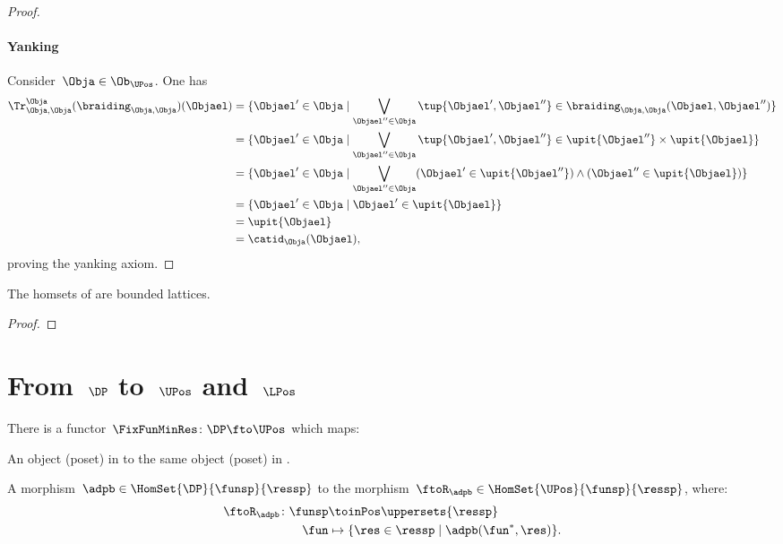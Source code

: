 \begin{proof}
    \paragraph*{Yanking}
    Consider~$\Obja\in \Ob_{\UPos}$. One has
    \begin{equation*}
    \begin{aligned}
        \Tr_{\Obja,\Obja}^{\Obja}(\braiding_{\Obja,\Obja})(\Objael)&=\{ \Objael'\in \Obja \mid \bigvee_{\Objael''\in \Obja}\tup{\Objael',\Objael''}\in \braiding_{\Obja,\Obja}(\Objael,\Objael'')\}\\
        &=\{ \Objael'\in \Obja \mid \bigvee_{\Objael''\in \Obja}\tup{\Objael',\Objael''}\in \upit\{\Objael''\}\times \upit\{ \Objael\}\}\\
        &=\{ \Objael'\in \Obja \mid \bigvee_{\Objael''\in \Obja} (\Objael'\in \upit\{\Objael''\}) \wedge(\Objael'' \in \upit\{ \Objael\})\}\\
        &=\{ \Objael'\in \Obja \mid \Objael'\in \upit\{\Objael\}\}\\
        &=\upit \{\Objael\}\\
        &=\catid_\Obja(\Objael),
    \end{aligned}
    \end{equation*}
    proving the yanking axiom.
\end{proof}

\begin{lemma}\label{lem:UPos-is-traced}
    The homsets of \UPos are bounded lattices.
  \end{lemma}
  \begin{proof}
  \end{proof}
  
  

\section{From~$\DP$ to~$\UPos$ and~$\LPos$}
\begin{lemma}
\label{lem:covfunctor}
There is a functor~$\FixFunMinRes\colon \DP \fto \UPos$ which maps:
\begin{compactenum}
\item An object (poset) in \DP to the same object (poset) in \UPos.
\item A morphism~$\adpb\in \HomSet{\DP}{\funsp}{\ressp}$ to the morphism~$\ftoR_{\adpb}\in \HomSet{\UPos}{\funsp}{\ressp}$, where:
\begin{equation}
\begin{aligned}
    \ftoR_{\adpb}\colon \funsp &\toinPos \uppersets{\ressp}\\
    \fun&\mapsto \{\res \in \ressp\mid \adpb(\fun^*,\res)\}.
\end{aligned}
\end{equation}
\end{compactenum}
\end{lemma}

